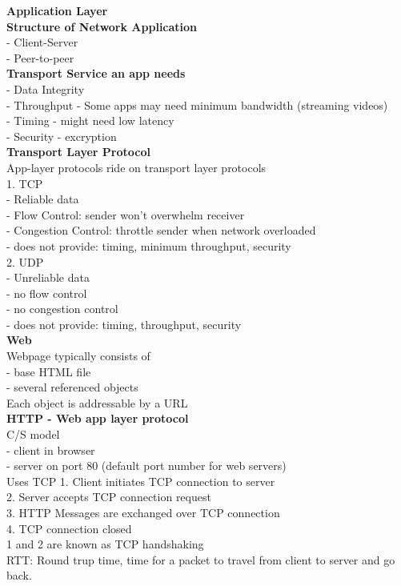 \documentclass[10pt, a4paper]{article}
\newcommand{\red}[1]{{\color{red}#1}}
\begin{document}
\begin{multicols*}{3}
		{\normalsize\textbf{Application Layer}}\\

		\textbf{Structure of Network Application}\\
		- Client-Server\\
		- Peer-to-peer\\

		\textbf{Transport Service an app needs}\\
		- Data Integrity\\
		- Throughput - Some apps may need minimum bandwidth (streaming videos)\\
		- Timing - might need low latency\\
		- Security - excryption\\

		\textbf{Transport Layer Protocol}\\
		App-layer protocols ride on transport layer protocols\\

		1. TCP\\
		- Reliable data\\
		- Flow Control: sender won't overwhelm receiver\\
		- Congestion Control: throttle sender when network overloaded\\
		- does not provide: \red{timing, minimum throughput, security}\\

		2. UDP\\
		- Unreliable data\\
		- no flow control\\
		- no congestion control\\
		- does not provide: timing, throughput, security\\

		\textbf{Web}\\
		Webpage typically consists of\\
		- base HTML file\\
		- several referenced objects\\
		Each object is addressable by a \red{URL}\\

		\textbf{HTTP - Web app layer protocol}\\
		C/S model\\
		- client in browser\\
		- server on port 80 (default port number for web servers)\\
		Uses TCP
		1. Client initiates TCP connection to server\\
		2. Server accepts TCP connection request\\
		3. HTTP Messages are exchanged over TCP connection\\
		4. TCP connection closed\\
		1 and 2 are known as \red{TCP handshaking}\\
		\red{RTT}: Round trup time, time for a packet to travel from client to server and go back.\\


\end{multicols*}
\end{document}
